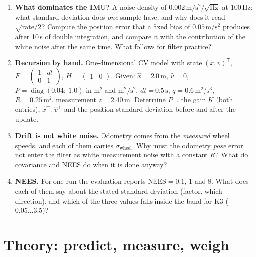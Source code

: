 \documentclass[12pt,a4paper]{scrartcl}
\begin{document}
\begin{enumerate}
  \item \textbf{What dominates the IMU?} A noise density of
        \(0.002\,\mathrm{m/s^2/\sqrt{Hz}}\) at \(100\,\mathrm{Hz}\): what standard
        deviation does \emph{one} sample have, and why does it read
        \(\sqrt{\text{rate}/2}\)? Compute the position error that a fixed bias of
        \(0.05\,\mathrm{m/s^2}\) produces after 10\,s of double integration, and compare
        it with the contribution of the white noise after the same time. What follows
        for filter practice?
  \item \textbf{Recursion by hand.} One-dimensional CV model with state
        \((x,v)^{\mathsf T}\), \(F=\left(\begin{smallmatrix}1&dt\\0&1\end{smallmatrix}\right)\),
        \(H=\begin{pmatrix}1&0\end{pmatrix}\). Given: \(\hat x=2.0\,\mathrm{m}\),
        \(\hat v=0\), \(P=\operatorname{diag}(0.04;\ 1.0)\) in \(\mathrm{m^2}\) and
        \(\mathrm{m^2/s^2}\), \(dt=0.5\,\mathrm{s}\), \(q=0.6\,\mathrm{m^2/s^3}\),
        \(R=0.25\,\mathrm{m^2}\), measurement \(z=2.40\,\mathrm{m}\). Determine
        \(P^{-}\), the gain \(K\) (both entries), \(\hat x^{+}\), \(\hat v^{+}\)
        and the position standard deviation before and after the update.
  \item \textbf{Drift is not white noise.} Odometry comes from the
        \emph{measured} wheel speeds, and each of them carries \(\sigma_\text{wheel}\).
        Why must the odometry \emph{pose} error not enter the filter as white measurement
        noise with a constant \(R\)? What do covariance and NEES do when it is
        done anyway?
  \item \textbf{NEES.} For one run the evaluation reports \(\overline{\text{NEES}}=0.1\),
        \(1\) and \(8\). What does each of them say about the stated
        standard deviation (factor, which direction), and which of the three values falls
        inside the band for K3 (\(0.05\ldots3.5\))?
\end{enumerate}

\section{Theory: predict, measure, weigh}\label{sec:theorie}
\end{document}
